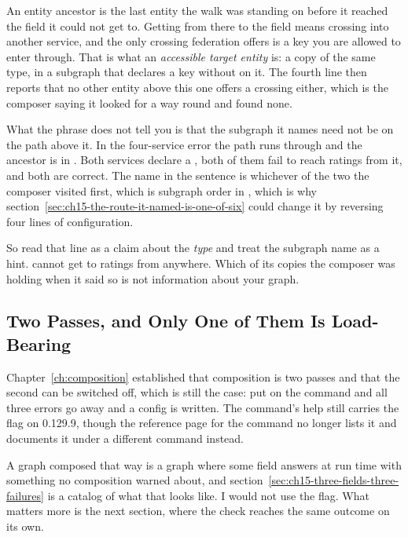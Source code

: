 %
An entity ancestor is the last entity the walk was standing on before it
reached the field it could not get to. Getting from there to the field means
crossing into another service, and the only crossing federation offers is a key
you are allowed to enter through. That is what an \emph{accessible target
entity} is: a copy of the same type, in a subgraph that declares a key without
 on it. The fourth line then reports that no other
entity above this one offers a crossing either, which is the composer saying it
looked for a way round and found none.

%
What the phrase does not tell you is that the subgraph it names need not be on
the path above it. In the four-service error the path runs through
 and the ancestor is in . Both services declare a
, both of them fail to reach ratings from it, and both are
correct. The name in the sentence is whichever of the two the composer visited
first, which is subgraph order in , which is why
section~\ref{sec:ch15-the-route-it-named-is-one-of-six} could change it by
reversing four lines of configuration.

%
So read that line as a claim about the \emph{type} and treat the subgraph name
as a hint.  cannot get to ratings from anywhere. Which of its
copies the composer was holding when it said so is not information about your
graph.

\subsection{Two Passes, and Only One of Them Is Load-Bearing}

%
Chapter~\ref{ch:composition} established that composition is two passes and
that the second can be switched off, which is still the case: put
 on the command and all three errors
go away and a config is written. The command's help still carries the flag on
 0.129.9, though the reference page for the command no longer lists
it and documents it under a different command instead.

%
A graph composed that way is a graph where some field answers at run time with
something no composition warned about, and
section~\ref{sec:ch15-three-fields-three-failures} is a catalog of what that
looks like. I would not use the flag. What matters more is the next section,
where the check reaches the same outcome on its own.
%

